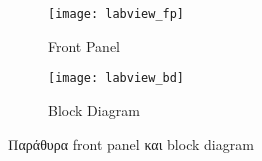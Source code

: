 \begin{figure}[h!]
  \centering
  \begin{subfigure}[b]{0.4\linewidth}
    \texttt{[image: labview\_fp]}
    \caption{Front Panel}
  \end{subfigure}
  \begin{subfigure}[b]{0.4\linewidth}
    \texttt{[image: labview\_bd]}
    \caption{Block Diagram}
  \end{subfigure}
  \caption{Παράθυρα front panel και block diagram}
  \label{fig:labview_example}
\end{figure}



